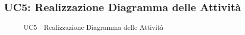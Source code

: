 \subsection{UC5: Realizzazione Diagramma delle Attività}
\label{UC5}



\begin{figure}[H]
\caption{UC5 - Realizzazione Diagramma delle Attività}
\end{figure}
